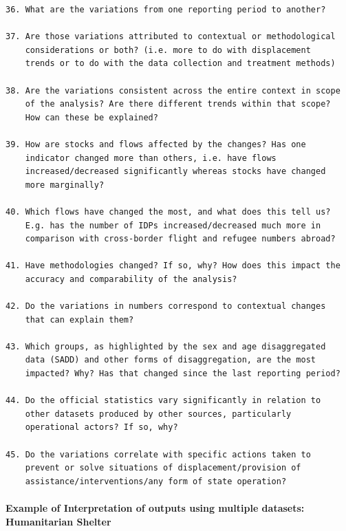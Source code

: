 \documentclass[
]{article}
\begin{document}
\begin{verbatim}
36. What are the variations from one reporting period to another?

37. Are those variations attributed to contextual or methodological
    considerations or both? (i.e. more to do with displacement
    trends or to do with the data collection and treatment methods)

38. Are the variations consistent across the entire context in scope
    of the analysis? Are there different trends within that scope?
    How can these be explained?

39. How are stocks and flows affected by the changes? Has one
    indicator changed more than others, i.e. have flows
    increased/decreased significantly whereas stocks have changed
    more marginally?

40. Which flows have changed the most, and what does this tell us?
    E.g. has the number of IDPs increased/decreased much more in
    comparison with cross-border flight and refugee numbers abroad?

41. Have methodologies changed? If so, why? How does this impact the
    accuracy and comparability of the analysis?

42. Do the variations in numbers correspond to contextual changes
    that can explain them?

43. Which groups, as highlighted by the sex and age disaggregated
    data (SADD) and other forms of disaggregation, are the most
    impacted? Why? Has that changed since the last reporting period?

44. Do the official statistics vary significantly in relation to
    other datasets produced by other sources, particularly
    operational actors? If so, why?

45. Do the variations correlate with specific actions taken to
    prevent or solve situations of displacement/provision of
    assistance/interventions/any form of state operation?
\end{verbatim}

\hypertarget{example-of-interpretation-of-outputs-using-multiple-datasets-humanitarian-shelter}{%
\paragraph{Example of Interpretation of outputs using multiple datasets: Humanitarian Shelter}\label{example-of-interpretation-of-outputs-using-multiple-datasets-humanitarian-shelter}}
\end{document}

